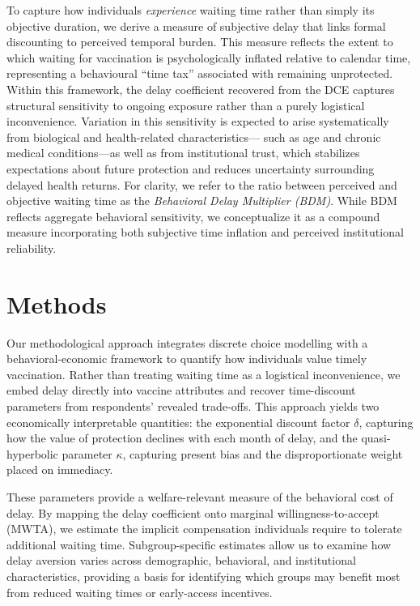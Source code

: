 \documentclass[preprint,12pt]{elsarticle}
\begin{document}
To capture how individuals \emph{experience} waiting time rather than simply
its objective duration, we derive a measure of subjective delay that links
formal discounting to perceived temporal burden. This measure reflects the
extent to which waiting for vaccination is psychologically inflated relative
to calendar time, representing a behavioural “time tax” associated with
remaining unprotected. Within this framework, the delay coefficient recovered
from the DCE captures structural sensitivity to ongoing exposure rather than
a purely logistical inconvenience. Variation in this sensitivity is expected
to arise systematically from biological and health-related characteristics—
such as age and chronic medical conditions—as well as from institutional
trust, which stabilizes expectations about future protection and reduces
uncertainty surrounding delayed health returns. For clarity, we refer to the
ratio between perceived and objective waiting time as the \emph{Behavioral
Delay Multiplier (BDM)}. While BDM reflects aggregate behavioral sensitivity, we conceptualize it as a compound measure incorporating both subjective time inflation and perceived institutional reliability.



\section{Methods}

Our methodological approach integrates discrete choice modelling with a behavioral-economic
framework to quantify how individuals value timely vaccination. Rather than treating waiting
time as a logistical inconvenience, we embed delay directly into vaccine attributes and recover
time-discount parameters from respondents’ revealed trade-offs. This approach yields two 
economically interpretable quantities: the exponential discount factor $\delta$, capturing
how the value of protection declines with each month of delay, and the quasi-hyperbolic 
parameter $\kappa$, capturing present bias and the disproportionate weight placed on 
immediacy.

These parameters provide a welfare-relevant measure of the behavioral cost of delay. By 
mapping the delay coefficient onto marginal willingness-to-accept (MWTA), we estimate the 
implicit compensation individuals require to tolerate additional waiting time. Subgroup-specific
estimates allow us to examine how delay aversion varies across demographic, behavioral, and 
institutional characteristics, providing a basis for identifying which groups may benefit most 
from reduced waiting times or early-access incentives.
\end{document}
